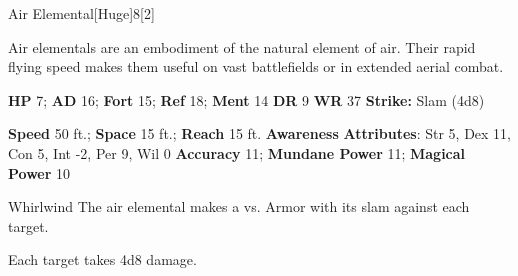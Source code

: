   \begin{monsection}{Air Elemental}[Huge]{8}[2]
    \vspace{-1em}\vspace{-1em}
    \vspace{0em}

    
    Air elementals are an embodiment of the natural element of air.
    Their rapid flying speed makes them useful on vast battlefields or in extended aerial combat.
  

    \begin{spellcontent}
      \begin{spelltargetinginfo}
        \pari \textbf{HP} 7;
          \textbf{AD} 16;
          \textbf{Fort} 15;
          \textbf{Ref} 18;
          \textbf{Ment} 14
        \pari \textbf{DR} 9
        \pari \textbf{WR} 37
        \pari \textbf{Strike:}
            Slam  (4d8)
      \end{spelltargetinginfo}
    \end{spellcontent}
    \begin{monsterfooter}
      \pari \textbf{Speed} 50 ft.;
        \textbf{Space} 15 ft.;
        \textbf{Reach} 15 ft.
      \pari \textbf{Awareness} 
      \pari \textbf{Attributes}:
        Str 5, Dex 11,
        Con 5, Int -2,
        Per 9, Wil 0
      \pari \textbf{Accuracy} 11;
        \textbf{Mundane Power} 11;
      \textbf{Magical Power} 10
    \end{monsterfooter}
  \end{monsection}
  \begin{freeability}{Whirlwind}
       The air elemental makes a 
         vs. Armor
        with its slam against each target.
    
    \hit Each target takes 4d8  damage.
    \end{freeability}
  
